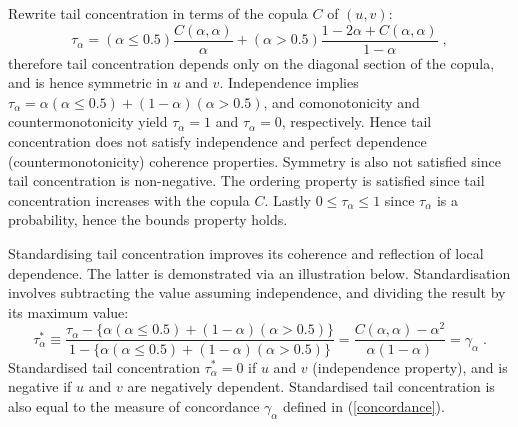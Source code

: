 \documentclass[authoryear]{elsarticle}
\newcommand{\eref}[1]{(\ref{#1})}
\begin{document}
Rewrite tail concentration in terms of the copula $C$ of $(u,v)$:
$$
\tau_\alpha = (\alpha\leq 0.5)\frac{C(\alpha,\alpha)}{\alpha}+(\alpha>0.5)\frac{1-2\alpha+C(\alpha,\alpha)}{1-\alpha} \;,
$$
therefore tail concentration depends only on the diagonal section of the copula, and is hence symmetric in $u$ and $v$. Independence implies $\tau_\alpha=\alpha(\alpha\leq 0.5)+(1-\alpha)(\alpha>0.5)$, and comonotonicity and countermonotonicity yield $\tau_\alpha=1$ and $\tau_\alpha=0$, respectively. Hence tail concentration does not satisfy independence and perfect dependence (countermonotonicity) coherence properties. Symmetry is also not satisfied since tail concentration is non-negative. The ordering property is satisfied since tail concentration increases with the copula $C$. Lastly $0\leq\tau_\alpha\leq 1$ since $\tau_\alpha$ is a probability, hence the bounds property holds.

Standardising tail concentration improves its coherence and reflection of local dependence. The latter is demonstrated via an illustration below. Standardisation involves subtracting the value assuming independence, and dividing the result by its maximum value:
$$
\tau_\alpha^* \equiv \frac{\tau_\alpha - \{\alpha(\alpha\leq 0.5)+(1-\alpha)(\alpha>0.5)\}}{1-\{\alpha(\alpha\leq 0.5)+(1-\alpha)(\alpha>0.5)\}}
=\frac{C(\alpha,\alpha)-\alpha^2}{\alpha(1-\alpha)} = \gamma_\alpha \;.
$$
Standardised tail concentration $\tau_\alpha^*=0$ if $u$ and $v$ (independence property), and is negative if $u$ and $v$ are negatively dependent. Standardised tail concentration is also equal to the measure of concordance $\gamma_\alpha$ defined in \eref{concordance}.
\end{document}
